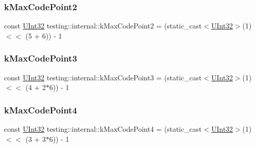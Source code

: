 \mbox{\label{namespacetesting_1_1internal_ab8f4a5ed784352f00342cfeadc72337e}} 
\subsubsection{\texorpdfstring{k\+Max\+Code\+Point2}{kMaxCodePoint2}}
{\footnotesize\ttfamily const \hyperlink{namespacetesting_1_1internal_a40d4fffcd2bf56f18b1c380615aa85e3}{U\+Int32} testing\+::internal\+::k\+Max\+Code\+Point2 = (static\+\_\+cast$<$\hyperlink{namespacetesting_1_1internal_a40d4fffcd2bf56f18b1c380615aa85e3}{U\+Int32}$>$(1) $<$$<$ (5 + 6)) -\/ 1}

\mbox{\label{namespacetesting_1_1internal_aa42bd507418e570402996e33582beed3}} 
\subsubsection{\texorpdfstring{k\+Max\+Code\+Point3}{kMaxCodePoint3}}
{\footnotesize\ttfamily const \hyperlink{namespacetesting_1_1internal_a40d4fffcd2bf56f18b1c380615aa85e3}{U\+Int32} testing\+::internal\+::k\+Max\+Code\+Point3 = (static\+\_\+cast$<$\hyperlink{namespacetesting_1_1internal_a40d4fffcd2bf56f18b1c380615aa85e3}{U\+Int32}$>$(1) $<$$<$ (4 + 2$\ast$6)) -\/ 1}

\mbox{\label{namespacetesting_1_1internal_acd87c60be9b5fedb2d017503d8834474}} 
\subsubsection{\texorpdfstring{k\+Max\+Code\+Point4}{kMaxCodePoint4}}
{\footnotesize\ttfamily const \hyperlink{namespacetesting_1_1internal_a40d4fffcd2bf56f18b1c380615aa85e3}{U\+Int32} testing\+::internal\+::k\+Max\+Code\+Point4 = (static\+\_\+cast$<$\hyperlink{namespacetesting_1_1internal_a40d4fffcd2bf56f18b1c380615aa85e3}{U\+Int32}$>$(1) $<$$<$ (3 + 3$\ast$6)) -\/ 1}


